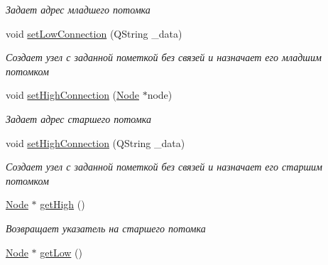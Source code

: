 \begin{DoxyCompactItemize}
\begin{DoxyCompactList}\small\item\em Задает адрес младшего потомка \end{DoxyCompactList}\item 
void \hyperlink{class_node_ab8a35e02d194a5f378120db368a22ded}{set\+Low\+Connection} (Q\+String \+\_\+data)\hypertarget{class_node_ab8a35e02d194a5f378120db368a22ded}{}\label{class_node_ab8a35e02d194a5f378120db368a22ded}

\begin{DoxyCompactList}\small\item\em Создает узел с заданной пометкой без связей и назначает его младшим потомком \end{DoxyCompactList}\item 
void \hyperlink{class_node_a77ee961e6ac046ecc4f52e2cea94ad19}{set\+High\+Connection} (\hyperlink{class_node}{Node} $\ast$node)\hypertarget{class_node_a77ee961e6ac046ecc4f52e2cea94ad19}{}\label{class_node_a77ee961e6ac046ecc4f52e2cea94ad19}

\begin{DoxyCompactList}\small\item\em Задает адрес старшего потомка \end{DoxyCompactList}\item 
void \hyperlink{class_node_a14d42baec35f7dcbe6273fb4e91132e3}{set\+High\+Connection} (Q\+String \+\_\+data)\hypertarget{class_node_a14d42baec35f7dcbe6273fb4e91132e3}{}\label{class_node_a14d42baec35f7dcbe6273fb4e91132e3}

\begin{DoxyCompactList}\small\item\em Создает узел с заданной пометкой без связей и назначает его старшим потомком \end{DoxyCompactList}\item 
\hyperlink{class_node}{Node} $\ast$ \hyperlink{class_node_abf9a87b58ca04ff3c730e2097eee6f19}{get\+High} ()\hypertarget{class_node_abf9a87b58ca04ff3c730e2097eee6f19}{}\label{class_node_abf9a87b58ca04ff3c730e2097eee6f19}

\begin{DoxyCompactList}\small\item\em Возвращает указатель на старшего потомка \end{DoxyCompactList}\item 
\hyperlink{class_node}{Node} $\ast$ \hyperlink{class_node_adf1eae3c27b3b6fb038f2a677743e4c3}{get\+Low} ()\hypertarget{class_node_adf1eae3c27b3b6fb038f2a677743e4c3}{}\label{class_node_adf1eae3c27b3b6fb038f2a677743e4c3}


\end{DoxyCompactItemize}
